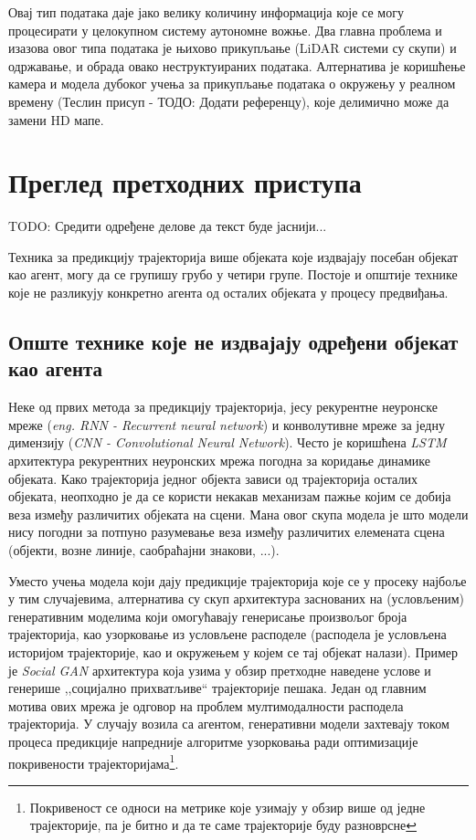 \documentclass[11pt,oneside]{memoir}
\begin{document}
Овај тип података даје јако велику количину информација које се могу процесирати у целокупном систему аутономне вожње. Два главна проблема
и изазова овог типа података је њихово прикупљање (LiDAR системи су скупи) и одржавање, и обрада овако неструктуираних података. Алтернатива
је коришћење камера и модела дубоког учења за прикупљање података о окружењу у реалном времену (Теслин присуп - ТОДО: Додати референцу), које
делимично може да замени HD мапе. 

\chapter{Преглед претходних приступа}
\label{chp:razrada}

TODO: Средити одређене делове да текст буде јаснији...

Техника за предикцију трајекторија више објеката које издвајају посебан објекат као агент, могу да се групишу грубо у четири групе. Постоје
и општије технике које не разликују конкретно агента од осталих објеката у процесу предвиђања.

\section{Опште технике које не издвајају одређени објекат као агента}

Неке од првих метода за предикцију трајекторија, јесу рекурентне неуронске мреже 
(\textit{eng. RNN - Recurrent neural network}) и конволутивне мреже за једну димензију (\textit{CNN - Convolutional Neural Network}). 
Често је коришћена \textit{LSTM} архитектура рекурентних неуронских мрежа погодна за коридање динамике објеката. 
Како трајекторија једног објекта зависи од трајекторија осталих објеката,
неопходно је да се користи некакав механизам пажње којим се добија веза између различитих објеката на сцени. \cite{argoverse} \cite{social_lstm} 
Мана овог скупа модела је што модели нису погодни за потпуно разумевање веза између различитих елемената сцена (објекти, возне линије, саобраћајни знакови, ...).

Уместо учења модела који дају предикције трајекторија које се у просеку најбоље у тим случајевима, 
алтернатива су скуп архитектура заснованих на (условљеним) генеративним моделима који
омогућавају генерисање произвољог броја трајекторија, као узорковање из условљене расподеле (расподела је условљена историјом трајекторије, као и
окружењем у којем се тај објекат налази). Пример је \textit{Social GAN} \cite{social_gan} архитектура која узима у обзир претходне наведене услове и генерише ,,социјално прихватљиве`` трајекторије
пешака. Један од главним мотива ових мрежа је одговор на проблем мултимодалности расподела трајекторија. 
У случају возила са агентом, генеративни модели захтевају током процеса предикције напредније алгоритме узорковања ради оптимизације покривености
трајекторијама\footnote{Покривеност се односи на метрике које узимају у обзир више од једне трајекторије, па је битно и да те
саме трајекторије буду разноврсне}.
\end{document}
